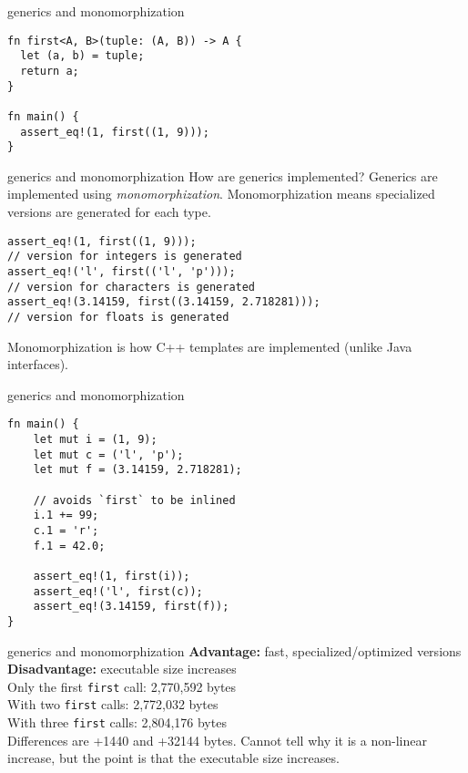 \documentclass{beamer}
\begin{document}
\begin{frame}[fragile]{generics and monomorphization}
  \begin{verbatim}
fn first<A, B>(tuple: (A, B)) -> A {
  let (a, b) = tuple;
  return a;
}

fn main() {
  assert_eq!(1, first((1, 9)));
}
  \end{verbatim}  
\end{frame}

\begin{frame}[fragile]{generics and monomorphization}
  How are generics implemented?
  Generics are implemented using \emph{monomorphization}.
  Monomorphization means specialized versions are generated for each type.

  \begin{verbatim}
assert_eq!(1, first((1, 9)));
// version for integers is generated
assert_eq!('l', first(('l', 'p')));
// version for characters is generated
assert_eq!(3.14159, first((3.14159, 2.718281)));
// version for floats is generated
  \end{verbatim}

  Monomorphization is how C++ templates are implemented (unlike Java interfaces).
\end{frame}

\begin{frame}[fragile]{generics and monomorphization}
  \begin{verbatim}
fn main() {
    let mut i = (1, 9);
    let mut c = ('l', 'p');
    let mut f = (3.14159, 2.718281);

    // avoids `first` to be inlined
    i.1 += 99;
    c.1 = 'r';
    f.1 = 42.0;

    assert_eq!(1, first(i));
    assert_eq!('l', first(c));
    assert_eq!(3.14159, first(f));
}
  \end{verbatim}  
\end{frame}

\begin{frame}[fragile]{generics and monomorphization}
  \textbf{Advantage:} fast, specialized/optimized versions \\
  \textbf{Disadvantage:} executable size increases \\[5pt]

  Only the first \texttt{first} call: 2,770,592 bytes \\
  With two \texttt{first} calls: 2,772,032 bytes \\
  With three \texttt{first} calls: 2,804,176 bytes \\[5pt]

  Differences are +1440 and +32144 bytes. Cannot tell why it is a non-linear increase, but the point is that the executable size increases.
\end{frame}
\end{document}
